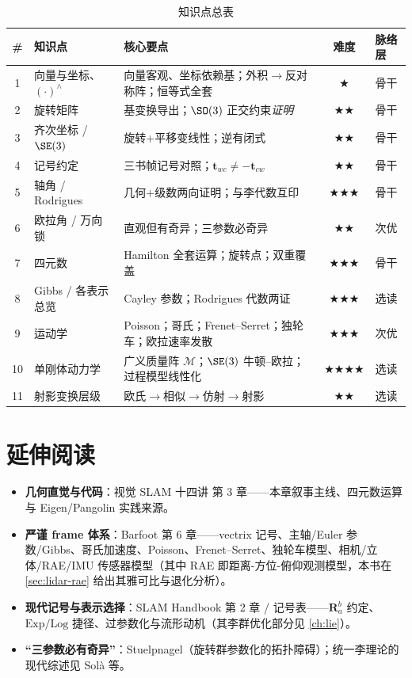 \begin{table}[H]\centering\small
\caption{知识点总表}
\begin{tabular}{cllcl}
\toprule
\# & 知识点 & 核心要点 & 难度 & 脉络层 \\
\midrule
1 & 向量与坐标、$(\cdot)^\wedge$ & 向量客观、坐标依赖基；外积$\to$反对称阵；恒等式全套 & \(\bigstar\) & 骨干\\
2 & 旋转矩阵 & 基变换导出；$\SO(3)$ 正交约束\emph{证明} & \(\bigstar\bigstar\) & 骨干\\
3 & 齐次坐标 / $\SE(3)$ & 旋转+平移变线性；逆有闭式 & \(\bigstar\bigstar\) & 骨干\\
4 & 记号约定 & 三书帧记号对照；$\mathbf{t}_{wc}\neq-\mathbf{t}_{cw}$ & \(\bigstar\bigstar\) & 骨干\\
5 & 轴角 / Rodrigues & 几何+级数两向证明；与李代数互印 & \(\bigstar\bigstar\bigstar\) & 骨干\\
6 & 欧拉角 / 万向锁 & 直观但有奇异；三参数必奇异 & \(\bigstar\bigstar\) & 次优\\
7 & 四元数 & Hamilton 全套运算；旋转点；双重覆盖 & \(\bigstar\bigstar\bigstar\) & 骨干\\
8 & Gibbs / 各表示总览 & Cayley 参数；Rodrigues 代数两证 & \(\bigstar\bigstar\bigstar\) & 选读\\
9 & 运动学 & Poisson；哥氏；Frenet--Serret；独轮车；欧拉速率发散 & \(\bigstar\bigstar\bigstar\) & 次优\\
10 & 单刚体动力学 & 广义质量阵 $\boldsymbol{\mathcal{M}}$；$\SE(3)$ 牛顿--欧拉；过程模型线性化 & \(\bigstar\bigstar\bigstar\bigstar\) & 选读\\
11 & 射影变换层级 & 欧氏$\to$相似$\to$仿射$\to$射影 & \(\bigstar\bigstar\) & 选读\\
\bottomrule
\end{tabular}
\end{table}

\section*{延伸阅读}
\begin{itemize}
  \item \textbf{几何直觉与代码}：视觉 SLAM 十四讲\cite{gaoxiang2019slam14} 第 3 章——本章叙事主线、四元数运算与 Eigen/Pangolin 实践来源。
  \item \textbf{严谨 frame 体系}：Barfoot\cite{barfoot2024state} 第 6 章——vectrix 记号、主轴/Euler 参数/Gibbs、哥氏加速度、Poisson、Frenet--Serret、独轮车模型、相机/立体/RAE/IMU 传感器模型（其中 RAE 即距离-方位-俯仰观测模型，本书在 \cref{sec:lidar-rae} 给出其雅可比与退化分析）。
  \item \textbf{现代记号与表示选择}：SLAM Handbook\cite{carlone2026handbook} 第 2 章 / 记号表——$\mathbf{R}_a^b$ 约定、$\mathrm{Exp}/\mathrm{Log}$ 捷径、过参数化与流形动机（其李群优化部分见 \cref{ch:lie}）。
  \item \textbf{“三参数必有奇异”}：Stuelpnagel\cite{stuelpnagel1964parametrization}（旋转群参数化的拓扑障碍）；统一李理论的现代综述见 Solà 等\cite{sola2018micro}。
\end{itemize}

